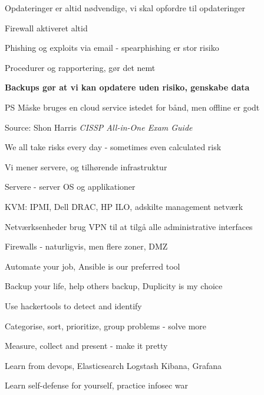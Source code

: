 \documentclass[20pt,landscape,a4paper,footrule]{foils}
\begin{document}



\begin{list1}
\item Opdateringer er altid nødvendige, vi skal opfordre til opdateringer
\item Firewall aktiveret altid
\item Phishing og exploits via email - spearphishing er stor risiko
\item Procedurer og rapportering, gør det nemt
\end{list1}

\vskip 5mm

\centerline{\bf Backups gør at vi kan opdatere uden risiko, genskabe data}

\vskip 5mm

PS Måske bruges en cloud service istedet for bånd, men offline er godt



Source: Shon Harris \emph{CISSP All-in-One Exam Guide}

\vskip 2cm
\centerline{We all take risks every day - sometimes even calculated risk}


\begin{list1}
\item Vi mener servere, og tilhørende infrastruktur
\item Servere - server OS og applikationer
\item KVM: IPMI, Dell DRAC, HP ILO, adskilte management netværk
\item Netværksenheder brug VPN til at tilgå alle administrative interfaces
\item Firewalls - naturligvis, men flere zoner, DMZ
\end{list1}


\begin{list1}
\item Automate your job, Ansible is our preferred tool
\item Backup your life, help others backup, Duplicity is my choice
\item Use hackertools to detect and identify
\item Categorise, sort, prioritize, group problems - solve more
\item Measure, collect and present - make it pretty
\item Learn from devops, Elasticsearch Logstash Kibana, Grafana
\item {} Learn self-defense for yourself, practice infosec war
\end{list1}
\end{document}
